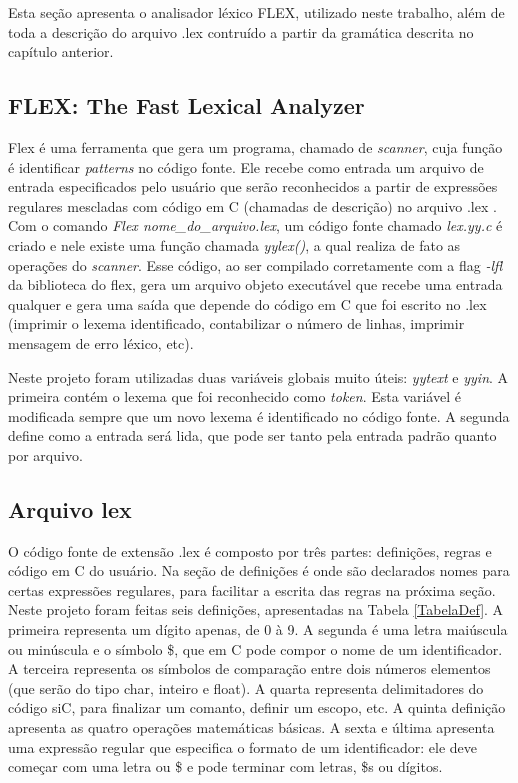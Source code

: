 \documentclass[12pt]{article}
\begin{document}
\indent Esta seção apresenta o analisador léxico FLEX, utilizado neste trabalho, além de toda a descrição do arquivo .lex contruído a partir da gramática descrita no capítulo anterior.

\subsection{FLEX: The Fast Lexical Analyzer}

\indent Flex é uma ferramenta que gera um programa, chamado de \textit{scanner}, cuja função é identificar \textit{patterns} no código fonte. Ele recebe como entrada um arquivo de entrada especificados pelo usuário que serão reconhecidos a partir de expressões regulares mescladas com código em C (chamadas de descrição) no arquivo .lex \cite{flex}. Com o comando \textit{Flex nome\_do\_arquivo.lex}, um código fonte chamado \textit{lex.yy.c} é criado e nele existe uma função chamada \textit{yylex()}, a qual realiza de fato as operações do \textit{scanner}. Esse código, ao ser compilado corretamente com a flag \textit{-lfl} da biblioteca do flex, gera um arquivo objeto executável que recebe uma entrada qualquer e gera uma saída que depende do código em C que foi escrito no .lex (imprimir o lexema identificado, contabilizar o número de linhas, imprimir mensagem de erro léxico, etc).

\indent Neste projeto foram utilizadas duas variáveis globais muito úteis: \textit{yytext} e \textit{yyin}. A primeira contém o lexema que foi reconhecido como \textit{token}. Esta variável é modificada sempre que um novo lexema é identificado no código fonte. A segunda define como a entrada será lida, que pode ser tanto pela entrada padrão quanto por arquivo.

\subsection{Arquivo lex}

\indent O código fonte de extensão .lex é composto por três partes: definições, regras e código em C do usuário. Na seção de definições é onde são declarados nomes para certas expressões regulares, para facilitar a escrita das regras na próxima seção. Neste projeto foram feitas seis definições, apresentadas na Tabela \ref{TabelaDef}. A primeira representa um dígito apenas, de 0 à 9. A segunda é uma letra maiúscula ou minúscula e o símbolo \$, que em C pode compor o nome de um identificador. A terceira representa os símbolos de comparação entre dois números elementos (que serão do tipo char, inteiro e float). A quarta representa delimitadores do código siC, para finalizar um comanto, definir um escopo, etc. A quinta definição apresenta as quatro operações matemáticas básicas. A sexta e última apresenta uma expressão regular que especifica o formato de um identificador: ele deve começar com uma letra ou \$ e pode terminar com letras, \$s ou dígitos.
\end{document}
